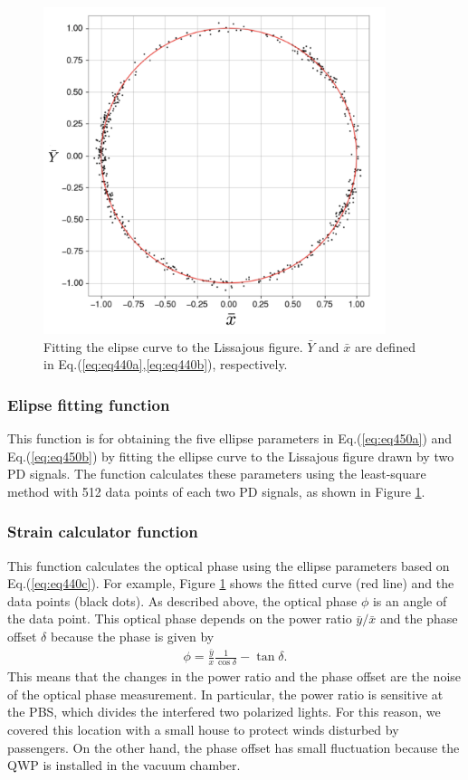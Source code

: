 \begin{figure}[h]
  \centering
  \includegraphics[width=10cm]{./img_chap4/img440.png}
  \caption{Fitting the elipse curve to the Lissajous figure. $\bar{Y}$ and $\bar{x}$ are defined in Eq.(\ref{eq:eq440a},\ref{eq:eq440b}), respectively. } \label{img:img440}
\end{figure}

\subsubsection{Elipse fitting function}
This function is for obtaining the five ellipse parameters in Eq.(\ref{eq:eq450a}) and Eq.(\ref{eq:eq450b}) by fitting the ellipse curve to the Lissajous figure drawn by two PD signals. The function calculates these parameters using the least-square method with 512 data points of each two PD signals, as shown in Figure \ref{img:img440}.

\subsubsection{Strain calculator function}
This function calculates the optical phase using the ellipse parameters based on Eq.(\ref{eq:eq440c}). For example, Figure  \ref{img:img440} shows the fitted curve (red line) and the data points (black dots). As described above, the optical phase $\phi$ is an angle of the data point. This optical phase depends on the power ratio $\bar{y}/\bar{x}$ and the phase offset $\delta$ because the phase is given by
\begin{eqnarray}
  \phi = \frac{\bar{y}}{x}\frac{1}{\cos{\delta}} - \tan{\delta}.
\end{eqnarray}
This means that the changes in the power ratio and the phase offset are the noise of the optical phase measurement. In particular, the power ratio is sensitive at the PBS, which divides the interfered two polarized lights. For this reason,  we covered this location with a small house to protect winds disturbed by passengers. On the other hand, the phase offset has small fluctuation because the QWP is installed in the vacuum chamber.

